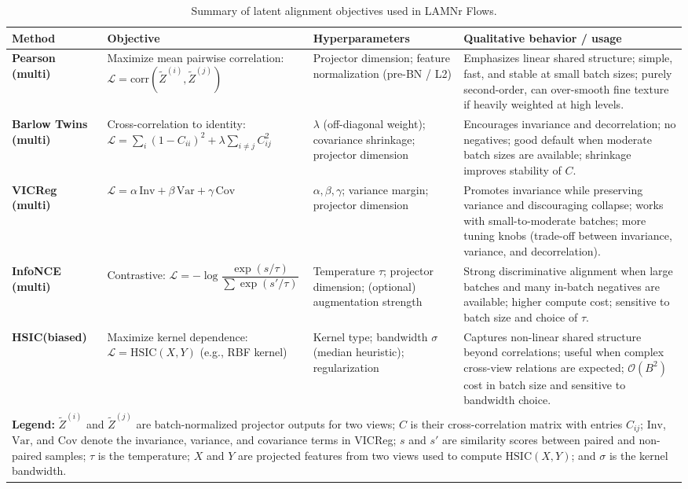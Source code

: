 \begin{table}[t]
\centering
\scriptsize
\begin{tabular}{p{1.5cm} p{3.75cm} p{3.1cm} p{5.5cm}}
\hline
\textbf{Method} &
\textbf{Objective} &
\textbf{Hyperparameters} &
\textbf{Qualitative behavior / usage} \\
\hline
\textbf{Pearson (multi)} &
Maximize mean pairwise correlation:
$\mathcal{L} = \mathrm{corr}(\tilde Z^{(i)}, \tilde Z^{(j)})$ &
Projector dimension; feature normalization (pre-BN / L2) &
Emphasizes linear shared structure; simple, fast, and stable at small batch sizes; purely second-order, can over-smooth fine texture if heavily weighted at high levels. \\[0.2em]
\textbf{Barlow Twins (multi)} &
Cross-correlation to identity: \newline
$\mathcal{L} = \sum_i (1 - C_{ii})^2 + \lambda \sum_{i \neq j} C_{ij}^2$ &
$\lambda$ (off-diagonal weight); covariance shrinkage; projector dimension &
Encourages invariance and decorrelation; no negatives; good default when moderate batch sizes are available; shrinkage improves stability of $C$. \\[0.2em]
\textbf{VICReg (multi)} &
$\mathcal{L} = \alpha\,\mathrm{Inv} + \beta\,\mathrm{Var} + \gamma\,\mathrm{Cov}$ &
$\alpha, \beta, \gamma$; variance margin; projector dimension &
Promotes invariance while preserving variance and discouraging collapse; works with small-to-moderate batches; more tuning knobs (trade-off between invariance, variance, and decorrelation). \\[0.2em]
\textbf{InfoNCE (multi)} &
Contrastive:  \newline
$\mathcal{L} = - \log \dfrac{\exp(s / \tau)}{\sum \exp(s' / \tau)}$ &
Temperature $\tau$; projector dimension; (optional) augmentation strength &
Strong discriminative alignment when large batches and many in-batch negatives are available; higher compute cost; sensitive to batch size and choice of $\tau$. \\[0.2em]
\textbf{HSIC}\newline \textbf{(biased)} &
Maximize kernel dependence: \newline
$\mathcal{L} = \mathrm{HSIC}(X,Y)$ (e.g., RBF kernel) &
Kernel type; bandwidth $\sigma$ (median heuristic); regularization &
Captures non-linear shared structure beyond correlations; useful when complex cross-view relations are expected; $\mathcal{O}(B^2)$ cost in batch size and sensitive to bandwidth choice. \\
\hline
\multicolumn{4}{p{14.2cm}}{\textbf{Legend:}
$\tilde Z^{(i)}$ and $\tilde Z^{(j)}$ are batch-normalized projector outputs for
two views; $C$ is their cross-correlation matrix with entries $C_{ij}$;
$\mathrm{Inv}$, $\mathrm{Var}$, and $\mathrm{Cov}$ denote the invariance,
variance, and covariance terms in VICReg; $s$ and $s'$ are similarity scores
between paired and non-paired samples; $\tau$ is the temperature; $X$ and $Y$
are projected features from two views used to compute $\mathrm{HSIC}(X,Y)$; and
$\sigma$ is the kernel bandwidth.} \\
\end{tabular}
\caption{Summary of latent alignment objectives used in LAMNr Flows.}
\label{tab:alignment}
\normalsize
\end{table}
